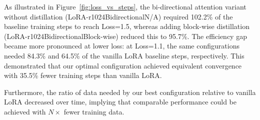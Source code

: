 As illustrated in Figure~\ref{fig:loss_vs_steps}, the bi-directional attention variant without distillation (LoRA-r1024\textbar{}Bidirectional\textbar{}N/A) required 102.2\% of the baseline training steps to reach Loss=1.5, whereas adding block-wise distillation (LoRA-r1024\textbar{}Bidirectional\textbar{}Block-wise) reduced this to 95.7\%. The efficiency gap became more pronounced at lower loss: at Loss=1.1, the same configurations needed 84.3\% and 64.5\% of the vanilla LoRA baseline steps, respectively. This demonstrated that our optimal configuration achieved equivalent convergence with 35.5\% fewer training steps than vanilla LoRA.

Furthermore, the ratio of data needed by our best configuration relative to vanilla LoRA decreased over time, implying that comparable performance could be achieved with $N\times$ fewer training data.
